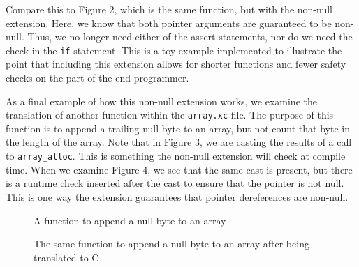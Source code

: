 \documentclass[main.tex]{subfiles}
\begin{document}
Compare this to Figure 2, which is the same function, but with the non-null extension. Here, we know that both pointer
arguments are guaranteed to be non-null. Thus, we no longer need either of the assert statements, nor do we need the check in
the \verb|if| statement. This is a toy example implemented to illustrate the point that including this extension allows for shorter functions and fewer safety checks on the part of the end programmer.

As a final example of how this non-null extension works, we examine the translation of another function within the \verb|array.xc|
file. The purpose of this function is to append a trailing null byte to an array, but not count that byte in the length of the array.
Note that in Figure 3, we are casting the results of a call to \verb|array_alloc|. This is something the non-null extension will check
at compile time. When we examine Figure 4, we see that the same cast is present, but there is a runtime check inserted after
the cast to ensure that the pointer is not null. This is one way the extension guarantees that pointer dereferences are non-null. 
\begin{figure}[p]

\caption{A function to append a null byte to an array}
\end{figure}
\begin{figure}[p]

\caption{The same function to append a null byte to an array after being translated to C}
\end{figure}
\end{document}
